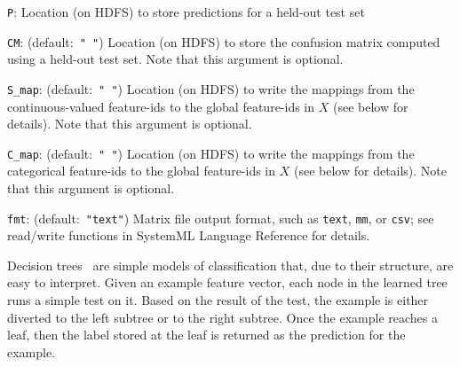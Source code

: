 \begin{Description}
	\item[{\tt P}:] 
	Location (on HDFS) to store predictions for a held-out test set
	\item[{\tt CM}:] (default:\mbox{ }{\tt " "})
	Location (on HDFS) to store the confusion matrix computed using a held-out test set. Note that this argument is optional.
	\item[{\tt S\_map}:] (default:\mbox{ }{\tt " "})
	Location (on HDFS) to write the mappings from the continuous-valued feature-ids to the global feature-ids in $X$ (see below for details). Note that this argument is optional.
	\item[{\tt C\_map}:] (default:\mbox{ }{\tt " "})
	Location (on HDFS) to write the mappings from the categorical feature-ids to the global feature-ids in $X$ (see below for details). Note that this argument is optional.
	\item[{\tt fmt}:] (default:\mbox{ }{\tt "text"})
	Matrix file output format, such as {\tt text}, {\tt mm}, or {\tt csv};
	see read/write functions in SystemML Language Reference for details.
\end{Description}


 \smallskip

 
Decision trees~\cite{BreimanFOS84:dtree} are simple models of
classification that,  due to their structure,  are easy to
interpret. Given an example feature vector, each node in the learned
tree runs a simple test on it. Based on the result of the test, the
example is either diverted to the left subtree or to the right
subtree. Once the example reaches a leaf, then the label stored at the
leaf is returned as the prediction for the example.


